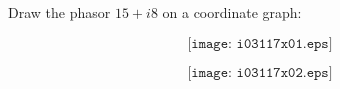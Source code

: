 

Draw the phasor $15 + i8 $ on a coordinate graph:

$$\texttt{[image: i03117x01.eps]}$$







$$\texttt{[image: i03117x02.eps]}$$











